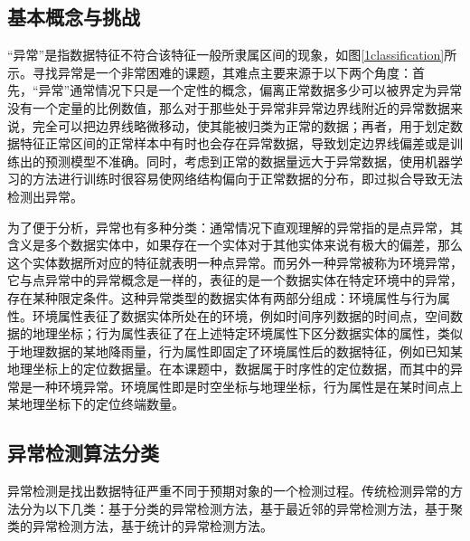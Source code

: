 \documentclass[a4paper,AutoFakeBold,oneside,12pt]{book}
\begin{document}
\subsection{基本概念与挑战}

“异常”是指数据特征不符合该特征一般所隶属区间的现象\cite{patcha2007overview}，如图\ref{1classification}所示。寻找异常是一个非常困难的课题，其难点主要来源于以下两个角度：首先，“异常”通常情况下只是一个定性的概念，偏离正常数据多少可以被界定为异常没有一个定量的比例数值，那么对于那些处于异常非异常边界线附近的异常数据来说，完全可以把边界线略微移动，使其能被归类为正常的数据；再者，用于划定数据特征正常区间的正常样本中有时也会存在异常数据，导致划定边界线偏差或是训练出的预测模型不准确。同时，考虑到正常的数据量远大于异常数据，使用机器学习的方法进行训练时很容易使网络结构偏向于正常数据的分布，即过拟合导致无法检测出异常。


为了便于分析，异常也有多种分类：通常情况下直观理解的异常指的是点异常，其含义是多个数据实体中，如果存在一个实体对于其他实体来说有极大的偏差，那么这个实体数据所对应的特征就表明一种点异常。而另外一种异常被称为环境异常，它与点异常中的异常概念是一样的，表征的是一个数据实体在特定环境中的异常，存在某种限定条件。这种异常类型的数据实体有两部分组成：环境属性与行为属性。环境属性表征了数据实体所处在的环境，例如时间序列数据的时间点，空间数据的地理坐标；行为属性表征了在上述特定环境属性下区分数据实体的属性，类似于地理数据的某地降雨量，行为属性即固定了环境属性后的数据特征，例如已知某地理坐标上的定位数据量。在本课题中，数据属于时序性的定位数据，而其中的异常是一种环境异常。环境属性即是时空坐标与地理坐标，行为属性是在某时间点上某地理坐标下的定位终端数量。

\subsection{异常检测算法分类}

  异常检测是找出数据特征严重不同于预期对象的一个检测过程。传统检测异常的方法分为以下几类\cite{chandola2009anomaly}：基于分类的异常检测方法，基于最近邻的异常检测方法，基于聚类的异常检测方法，基于统计的异常检测方法。
\end{document}
